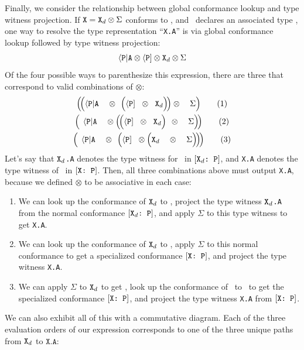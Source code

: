 \documentclass[../generics]{subfiles}
\begin{document}
Finally, we consider the relationship between global conformance lookup and type witness projection. If $\texttt{X}=\texttt{X}_d\otimes\Sigma$ conforms to \tP, and \tP\ declares an associated type \nA, one way to resolve the type representation ``\texttt{X.A}'' is via global conformance lookup followed by type witness projection:
\[\langle\texttt{P}|\texttt{A}\otimes\langle\texttt{P}]\otimes\texttt{X}_d\otimes\Sigma\]
Of the four possible ways to parenthesize this expression, there are three that correspond to valid combinations of $\otimes$:
\newcommand{\PB}{\phantom{\Big(}}
\newcommand{\PBB}{\phantom{\Big(\!\Big(}}
\begin{gather*}
\Big(\!\Big( \APA \PBB \otimes \PB\!\Big( \PP \PB \otimes \PB \tXd \Big)\!\Big) \otimes \PBB \Sigma \Big) \tag{1}\\
\Big(\!\PB \APA \PBB \otimes \Big(\!\Big(\PP \PB \otimes \PB \tXd \Big)\!\PB \otimes \PBB \Sigma \Big)\!\Big) \tag{2}\\
\Big(\!\PB \APA \PBB \otimes \PB\! \Big( \PP \PB \otimes \Big( \tXd \PBB \otimes \PBB \Sigma \Big)\!\Big)\!\Big) \tag{3}
\end{gather*}
Let's say that \texttt{$\texttt{X}_d$.A} denotes the type witness for \nA\ in $[\texttt{$\texttt{X}_d$:~P}]$, and \texttt{X.A} denotes the type witness of \nA\ in $[\texttt{X:~P}]$. Then, all three combinations above must output \texttt{X.A}, because we defined $\otimes$ to be associative in each case:
\begin{enumerate}
\item We can look up the conformance of $\texttt{X}_d$ to \tP, project the type witness \texttt{$\texttt{X}_d$.A} from the normal conformance $[\texttt{$\texttt{X}_d$:~P}]$, and apply $\Sigma$ to this type witness to get \texttt{X.A}.
\item We can look up the conformance of $\texttt{X}_d$ to \tP, apply $\Sigma$ to this normal conformance to get a specialized conformance $[\texttt{X:~P}]$, and project the type witness \texttt{X.A}.
\item We can apply $\Sigma$ to $\texttt{X}_d$ to get \tX, look up the conformance of \tX\ to \tP\ to get the specialized conformance $[\texttt{X:~P}]$, and project the type witness \texttt{X.A} from $[\texttt{X:~P}]$.
\end{enumerate}
We can also exhibit all of this with a commutative diagram. Each of the three evaluation orders of our expression corresponds to one of the three unique paths from $\texttt{X}_d$ to $\texttt{X.A}$:
\begin{center}
\end{center}
\end{document}
